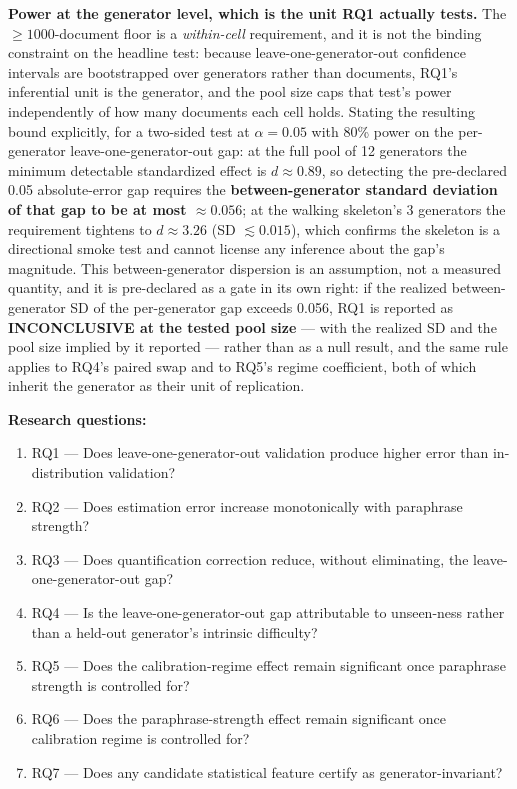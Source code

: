 \documentclass[11pt]{article}
\begin{document}
\textbf{Power at the generator level, which is the unit RQ1 actually tests.} The $\geq 1000$-document floor is a \emph{within-cell} requirement, and it is not the binding constraint on the headline test: because leave-one-generator-out confidence intervals are bootstrapped over generators rather than documents, RQ1's inferential unit is the generator, and the pool size caps that test's power independently of how many documents each cell holds. Stating the resulting bound explicitly, for a two-sided test at $\alpha = 0.05$ with 80\% power on the per-generator leave-one-generator-out gap: at the full pool of 12 generators the minimum detectable standardized effect is $d \approx 0.89$, so detecting the pre-declared 0.05 absolute-error gap requires the \textbf{between-generator standard deviation of that gap to be at most $\approx 0.056$}; at the walking skeleton's 3 generators the requirement tightens to $d \approx 3.26$ (SD $\lesssim 0.015$), which confirms the skeleton is a directional smoke test and cannot license any inference about the gap's magnitude. This between-generator dispersion is an assumption, not a measured quantity, and it is pre-declared as a gate in its own right: if the realized between-generator SD of the per-generator gap exceeds 0.056, RQ1 is reported as \textbf{INCONCLUSIVE at the tested pool size} --- with the realized SD and the pool size implied by it reported --- rather than as a null result, and the same rule applies to RQ4's paired swap and to RQ5's regime coefficient, both of which inherit the generator as their unit of replication.

\textbf{Research questions:}
\begin{enumerate}[leftmargin=1.6em]
\item RQ1 --- Does leave-one-generator-out validation produce higher error than in-distribution validation?
\item RQ2 --- Does estimation error increase monotonically with paraphrase strength?
\item RQ3 --- Does quantification correction reduce, without eliminating, the leave-one-generator-out gap?
\item RQ4 --- Is the leave-one-generator-out gap attributable to unseen-ness rather than a held-out generator's intrinsic difficulty?
\item RQ5 --- Does the calibration-regime effect remain significant once paraphrase strength is controlled for?
\item RQ6 --- Does the paraphrase-strength effect remain significant once calibration regime is controlled for?
\item RQ7 --- Does any candidate statistical feature certify as generator-invariant?
\end{enumerate}
\end{document}
